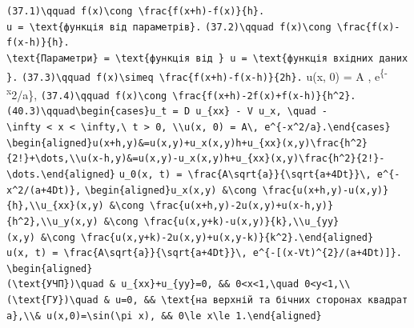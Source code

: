 \documentclass[
  ukrainian,
]{article}
\begin{document}
\texttt{(37.1)\textbackslash{}qquad\ f\textquotesingle{}(x)\textbackslash{}cong\ \textbackslash{}frac\{f(x+h)-f(x)\}\{h\}.}
\texttt{u\ =\ \textbackslash{}text\{функція\ від\ параметрів\}.}
\texttt{(37.2)\textbackslash{}qquad\ f\textquotesingle{}(x)\textbackslash{}cong\ \textbackslash{}frac\{f(x)-f(x-h)\}\{h\}.}
\texttt{\textbackslash{}text\{Параметри\}\ =\ \textbackslash{}text\{функція\ від\ \}\ u\ =\ \textbackslash{}text\{функція\ вхідних\ даних\}.}
\texttt{(37.3)\textbackslash{}qquad\ f\textquotesingle{}(x)\textbackslash{}simeq\ \textbackslash{}frac\{f(x+h)-f(x-h)\}\{2h\}.}
u(x, 0) = A , e\textsuperscript{\{-x}2/a\},
\texttt{(37.4)\textbackslash{}qquad\ f\textquotesingle{}\textquotesingle{}(x)\textbackslash{}cong\ \textbackslash{}frac\{f(x+h)-2f(x)+f(x-h)\}\{h\^{}2\}.}
\texttt{(40.3)\textbackslash{}qquad\textbackslash{}begin\{cases\}u\_t\ =\ D\ u\_\{xx\}\ -\ V\ u\_x,\ \textbackslash{}quad\ -\textbackslash{}infty\ \textless{}\ x\ \textless{}\ \textbackslash{}infty,\textbackslash{}\ t\ \textgreater{}\ 0,\ \textbackslash{}\textbackslash{}u(x,\ 0)\ =\ A\textbackslash{},\ e\^{}\{-x\^{}2/a\}.\textbackslash{}end\{cases\}}
\texttt{\textbackslash{}begin\{aligned\}u(x+h,y)\&=u(x,y)+u\_x(x,y)h+u\_\{xx\}(x,y)\textbackslash{}frac\{h\^{}2\}\{2!\}+\textbackslash{}dots,\textbackslash{}\textbackslash{}u(x-h,y)\&=u(x,y)-u\_x(x,y)h+u\_\{xx\}(x,y)\textbackslash{}frac\{h\^{}2\}\{2!\}-\textbackslash{}dots.\textbackslash{}end\{aligned\}}
\texttt{u\_0(x,\ t)\ =\ \textbackslash{}frac\{A\textbackslash{}sqrt\{a\}\}\{\textbackslash{}sqrt\{a+4Dt\}\}\textbackslash{},\ e\^{}\{-x\^{}2/(a+4Dt)\},}
\texttt{\textbackslash{}begin\{aligned\}u\_x(x,y)\ \&\textbackslash{}cong\ \textbackslash{}frac\{u(x+h,y)-u(x,y)\}\{h\},\textbackslash{}\textbackslash{}u\_\{xx\}(x,y)\ \&\textbackslash{}cong\ \textbackslash{}frac\{u(x+h,y)-2u(x,y)+u(x-h,y)\}\{h\^{}2\},\textbackslash{}\textbackslash{}u\_y(x,y)\ \&\textbackslash{}cong\ \textbackslash{}frac\{u(x,y+k)-u(x,y)\}\{k\},\textbackslash{}\textbackslash{}u\_\{yy\}(x,y)\ \&\textbackslash{}cong\ \textbackslash{}frac\{u(x,y+k)-2u(x,y)+u(x,y-k)\}\{k\^{}2\}.\textbackslash{}end\{aligned\}}
\texttt{u(x,\ t)\ =\ \textbackslash{}frac\{A\textbackslash{}sqrt\{a\}\}\{\textbackslash{}sqrt\{a+4Dt\}\}\textbackslash{},\ e\^{}\{-{[}(x-Vt)\^{}\{2\}/(a+4Dt){]}\}.}
\texttt{\textbackslash{}begin\{aligned\}(\textbackslash{}text\{УЧП\})\textbackslash{}quad\ \&\ u\_\{xx\}+u\_\{yy\}=0,\ \&\&\ 0\textless{}x\textless{}1,\textbackslash{}quad\ 0\textless{}y\textless{}1,\textbackslash{}\textbackslash{}(\textbackslash{}text\{ГУ\})\textbackslash{}quad\ \&\ u=0,\ \&\&\ \textbackslash{}text\{на\ верхній\ та\ бічних\ сторонах\ квадрата\},\textbackslash{}\textbackslash{}\&\ u(x,0)=\textbackslash{}sin(\textbackslash{}pi\ x),\ \&\&\ 0\textbackslash{}le\ x\textbackslash{}le\ 1.\textbackslash{}end\{aligned\}}
\end{document}

